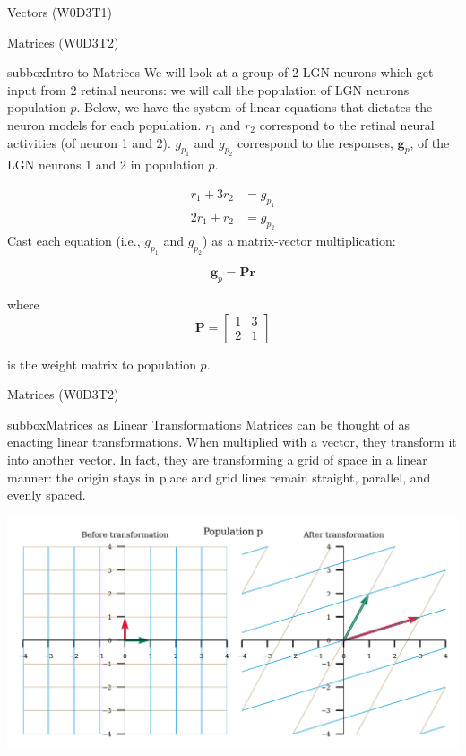 \begin{multicols}{3}
\begin{textbox}{Vectors (W0D3T1) }
\end{textbox}
\begin{textbox}{Matrices (W0D3T2)  }
\begin{subbox}{subbox}{Intro to Matrices}
\scriptsize
We will look at a group of 2 LGN neurons which get input from 2 retinal neurons: we will call the population of LGN neurons population $p$. Below, we have the system of linear equations that dictates the neuron models for each population. $r_1$ and $r_2$ correspond to the retinal neural activities (of neuron 1 and 2). $g_{p_1}$ and  $g_{p_2}$ correspond to the responses, $\mathbf{g}_p$, of the LGN neurons 1 and 2 in population $p$. 

\begin{align}
r_1 + 3r_2 &= g_{p_1} \\
2r_1 + r_2 &= g_{p_2} 
\end{align}
Cast each equation (i.e., $g_{p_1}$ and $g_{p_2}$) as a matrix-vector multiplication: 

\begin{equation}
\mathbf{g}_p = \mathbf{P}\mathbf{r}
\end{equation}

where \begin{equation}\mathbf{P}=
\begin{bmatrix}
1 & 3 \\
2 & 1
\end{bmatrix}
\end{equation}

is the weight matrix to population $p$. 
\end{subbox}
\end{textbox}
\begin{textbox}{Matrices (W0D3T2)}

\begin{subbox}{subbox}{Matrices as Linear Transformations}
\scriptsize
Matrices can be thought of as enacting linear transformations. When multiplied with a vector, they transform it into another vector. In fact, they are transforming a grid of space in a linear manner: the origin stays in place and grid lines remain straight, parallel, and evenly spaced.

\centering
\includegraphics[scale=0.5]{Figures/PreCourse/Figure4.png}
\end{subbox}



\end{textbox}
\end{multicols}
